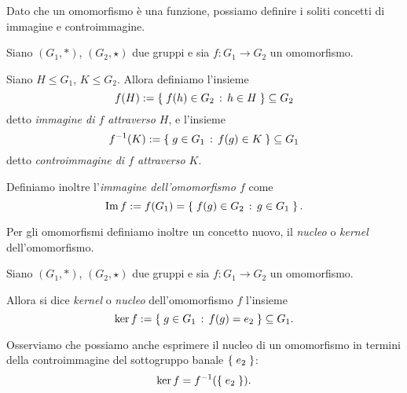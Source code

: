 Dato che un omomorfismo è una funzione, possiamo definire i soliti concetti di immagine e controimmagine.

\begin{definition}
     \label{def:omo_imm_controimm}
    Siano $(G_1, *)$, $(G_2, \star)$ due gruppi e sia $f : G_1 \to G_2$ un omomorfismo.

    Siano $H \leq G_1$, $K \leq G_2$. Allora definiamo l'insieme \[
        f(H) := \left\{\;f(h) \in G_2 \,:\, h \in H\;\right\} \subseteq G_2    
    \] detto \emph{immagine di $f$ attraverso $H$}, e l'insieme \[
        f^{-1}(K) := \left\{\;g \in G_1 \,:\, f(g) \in K\;\right\} \subseteq G_1
    \] detto \emph{controimmagine di $f$ attraverso $K$}.

    Definiamo inoltre l'\emph{immagine dell'omomorfismo $f$} come \[
        \operatorname{Im} f := f(G_1) = \left\{\;f(g) \in G_2 \,:\, g \in G_1\;\right\}.     
    \]
\end{definition}

Per gli omomorfismi definiamo inoltre un concetto nuovo, il \emph{nucleo} o \emph{kernel} dell'omomorfismo.

\begin{definition}
     \label{def:kernel_omo}
    Siano $(G_1, *)$, $(G_2, \star)$ due gruppi e sia $f : G_1 \to G_2$ un omomorfismo.

    Allora si dice \emph{kernel} o \emph{nucleo} dell'omomorfismo $f$ l'insieme \[
        \ker f := \left\{\;g \in G_1 \,:\, f(g) = e_2\;\right\} \subseteq G_1.    
    \]
\end{definition}

Osserviamo che possiamo anche esprimere il nucleo di un omomorfismo in termini della controimmagine del sottogruppo banale $\left\{\;e_2\;\right\}$: \[
    \ker f = f^{-1}(\left\{\;e_2\;\right\}).
\]

